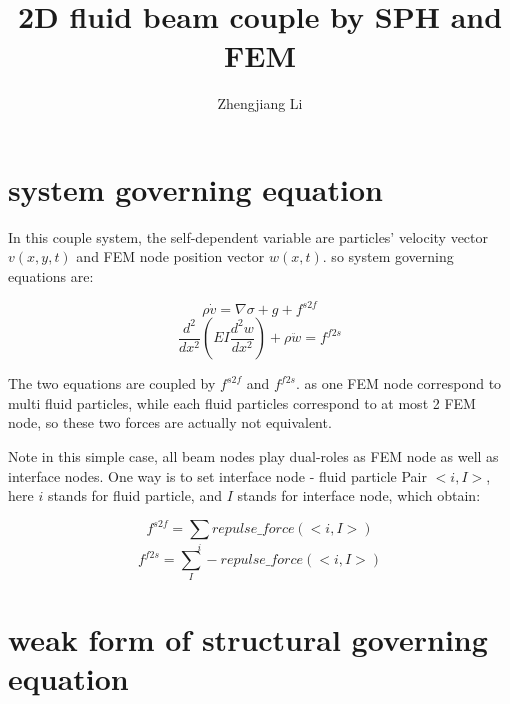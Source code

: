 \documentclass[11pt]{article}
\begin{document}
\title{2D fluid beam couple by SPH and FEM}

\author{Zhengjiang Li}

\date{}

\maketitle



\section {system governing equation}

In this couple system, the self-dependent variable are particles' velocity vector $v(x,y,t)$ and FEM node position vector $w(x,t)$. so system governing equations are:

   $$	\rho  \dot{v} = \nabla \sigma + g + f^{s2f} $$ 
   $$	\frac{d^2}{dx^2}(EI \frac{d^2w}{dx^2} ) + \rho \ddot{w} = f^{f2s} $$

The two equations are coupled by $f^{s2f}$ and $f^{f2s}$. as one FEM node correspond to multi fluid particles, while each fluid particles correspond to at most 2 FEM node, so these two forces are actually not equivalent.


Note in this simple case, all beam nodes play dual-roles as FEM node as well as interface nodes. One way is to set interface node - fluid particle Pair $<i, I>$, here $i$ stands for fluid particle, and $I$ stands for interface node, which obtain:

$$ f^{s2f} = \sum_i repulse\_force(<i,I>) $$
$$ f^{f2s} = \sum_I -repulse\_force(<i,I>) $$

\section{weak form of structural governing equation}
\end{document}
